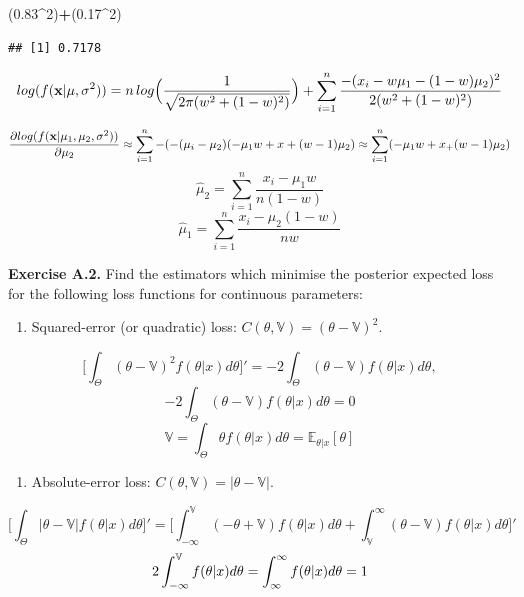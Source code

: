 \documentclass[]{article}
\newenvironment{Shaded}{\begin{snugshade}}{\end{snugshade}}
\newcommand{\DecValTok}[1]{\textcolor[rgb]{0.00,0.00,0.81}{#1}}
\newcommand{\FloatTok}[1]{\textcolor[rgb]{0.00,0.00,0.81}{#1}}
\newcommand{\NormalTok}[1]{#1}
\newcommand{\OperatorTok}[1]{\textcolor[rgb]{0.81,0.36,0.00}{\textbf{#1}}}
\providecommand{\tightlist}{%
  \setlength{\itemsep}{0pt}\setlength{\parskip}{0pt}}
\begin{document}
\begin{Shaded}
\begin{Highlighting}[]
\NormalTok{(}\FloatTok{0.83}\OperatorTok{^}\DecValTok{2}\NormalTok{)}\OperatorTok{+}\NormalTok{(}\FloatTok{0.17}\OperatorTok{^}\DecValTok{2}\NormalTok{)}
\end{Highlighting}
\end{Shaded}

\begin{verbatim}
## [1] 0.7178
\end{verbatim}

\[ log(f(\mathbf{x} | \mu, \sigma^2)) = n \thinspace log\Big(\frac{1}{\sqrt{2\pi (w^2 + (1-w)^2)}}\Big) + 
\sum_{i = 1}^{n} \frac{-(x_i - w\mu_1 - (1 - w)\mu_2)^2}{2 (w^2 + (1-w)^2)} \]

\[ 
\frac{\partial log(f(\mathbf{x} | \mu_1, \mu_2, \sigma^2))}{\partial \mu_2} \approx   
\sum_{i = 1}^{n} -(-(\mu_i - \mu_2)(-\mu_1w + x + (w - 1)\mu_2) \\
\approx   
\sum_{i = 1}^{n} (-\mu_1w + x_ + (w - 1)\mu_2)
\] \[ \hat \mu_2 = \sum_{i = 1}^{n} \frac{x_i - \mu_1w}{n(1 - w)} \]
\[ \hat \mu_1 = \sum_{i = 1}^{n} \frac{x_i - \mu_2(1-w)}{nw} \]

\textbf{Exercise A.2.} Find the estimators which minimise the posterior
expected loss for the following loss functions for continuous
parameters:

\begin{enumerate}
\def\labelenumi{(\alph{enumi})}
\tightlist
\item
  Squared-error (or quadratic) loss:
  \(C(\theta, \mathbb{V}) = (\theta - \mathbb{V})^2\).
\end{enumerate}

\[\Big[\int_{\Theta} (\theta - \mathbb{V})^2 f(\theta | x)d\theta \Big]' = -2 \int_{\Theta} (\theta - \mathbb{V}) f(\theta | x)d\theta,\]
\[-2 \int_{\Theta} (\theta - \mathbb{V}) f(\theta | x)d\theta = 0 \]
\[\mathbb{V} = \int_{\Theta} \theta  f(\theta | x)d\theta = \mathbb{E}_{\theta|x}[\theta]\]

\begin{enumerate}
\def\labelenumi{(\alph{enumi})}
\setcounter{enumi}{1}
\tightlist
\item
  Absolute-error loss:
  \(C(\theta, \mathbb{V}) = |\theta - \mathbb{V}|\).
\end{enumerate}

\[\Big[\int_{\Theta} |\theta - \mathbb{V}|f(\theta | x)d\theta \Big]' =
\Big[\int_{-\infty}^{\mathbb{V}} (-\theta + \mathbb{V})  f(\theta | x)d\theta + 
\int_{\mathbb{V}}^{\infty} (\theta - \mathbb{V}) 
f(\theta | x)d\theta \Big]'\]
\[2 \int_{-\infty}^{\mathbb{V}}f(\theta | x)d\theta =
\int_{\infty}^{\infty}f(\theta | x)d\theta = 1\\\]
\end{document}
